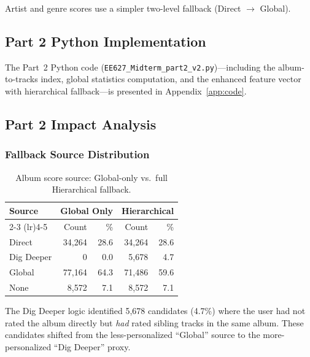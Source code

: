 \documentclass[12pt]{article}
\begin{document}
Artist and genre scores use a simpler two-level fallback (Direct $\rightarrow$ Global).

\subsection{Part 2 Python Implementation}

The Part~2 Python code (\texttt{EE627\_Midterm\_part2\_v2.py})---including the album-to-tracks index, global statistics computation, and the enhanced feature vector with hierarchical fallback---is presented in Appendix~\ref{app:code}.

\newpage
\subsection{Part 2 Impact Analysis}

\subsubsection{Fallback Source Distribution}

\begin{table}[H]
	\centering
	\begin{tabular}{lrrrr}
		\toprule
		\textbf{Source} & \multicolumn{2}{c}{\textbf{Global Only}} & \multicolumn{2}{c}{\textbf{Hierarchical}} \\
		\cmidrule(lr){2-3} \cmidrule(lr){4-5}
		& Count & \% & Count & \% \\
		\midrule
		Direct     & 34,264 & 28.6 & 34,264 & 28.6 \\
		Dig Deeper &      0 &  0.0 &  5,678 &  4.7 \\
		Global     & 77,164 & 64.3 & 71,486 & 59.6 \\
		None       &  8,572 &  7.1 &  8,572 &  7.1 \\
		\bottomrule
	\end{tabular}
	\caption{Album score source: Global-only vs.\ full Hierarchical fallback.}\label{tab:source-compare}
\end{table}

The Dig Deeper logic identified 5,678 candidates (4.7\%) where the user had not rated the album directly but \emph{had} rated sibling tracks in the same album. These candidates shifted from the less-personalized ``Global'' source to the more-personalized ``Dig Deeper'' proxy.
\end{document}
